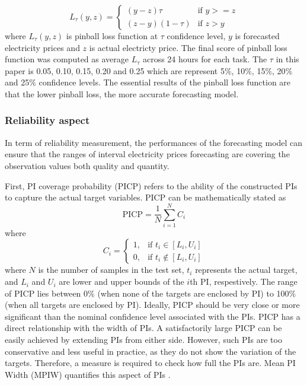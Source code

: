 \documentclass[review]{elsarticle}
\begin{document}
          \begin{equation}
            L_{\tau}(y,z) =
            \begin{cases}
              (y-z)\tau & \text{if  $y>=z$} \\
              (z-y)(1-\tau) & \text{if  $z>y$}
            \end{cases}
            \label{eq.pinball}
          \end{equation}
          where $L_{\tau}(y,z)$ is pinball loss function at $\tau$ confidence level, $y$ is forecasted electricity prices and $z$ is actual electricty price.
          The final score of pinball loss function was computed as average $L_{\tau}$ across 24 hours for each task.
          The $\tau$ in this paper is 0.05, 0.10, 0.15, 0.20 and 0.25 which are represent 5$\%$, 10$\%$, 15$\%$, 20$\%$ and 25$\%$ confidence levels.
          The essential results of the pinball loss function are that the lower pinball loss, the more accurate forecasting model.

        \subsubsection{Reliability aspect}
          In term of reliability measurement, the performances of the forecasting model can ensure that the ranges of interval electricity prices forecasting are covering the observation values both quality and quantity.

          First,  PI coverage probability (PICP) refers to the ability of the constructed PIs to capture the actual target variables.
          PICP can be mathematically stated as
          \begin{equation}
            \text{PICP} = \frac{1}{N} \sum_{i=1}^{N} C_{i}
            \label{eq.PICP}
          \end{equation}
          where
          \begin{equation}
            C_{i} =
            \begin{cases}
              1, & \text{if  $t_{i} \in [L_{i},U_{i}]$} \\
              0, & \text{if  $t_{i} \not\in [L_{i},U_{i}]$}
            \end{cases}
            \label{eq.Ci}
          \end{equation}
          where $N$ is the number of samples in the test set, $t_{i}$ represents the actual target, and $L_{i}$ and $U_{i}$ are lower and upper bounds of the $i$th PI, respestively.
          The range of PICP lies between 0$\%$ (when none of the targets are enclosed by PI) to 100$\%$ (when all targets are enclosed by PI).
          Ideally, PICP should be very close or more significant than the nominal confidence level associated with the PIs.
          PICP has a direct relationship with the width of PIs.
          A satisfactorily large PICP can be easily achieved by extending PIs from either side.
          However, such PIs are too conservative and less useful in practice, as they do not show the variation of the targets.
          Therefore, a measure is required to check how full the PIs are.
          Mean PI Width (MPIW) quantifies this aspect of PIs \cite{Khosravi2010}.
\end{document}
